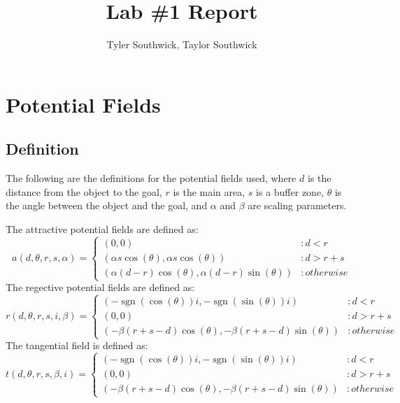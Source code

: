 \documentclass[11pt]{article}
\begin{document}
\newcommand{\sgn}{\operatorname{sgn}}

\title{Lab \#1 Report}

\author{Tyler Southwick, Taylor Southwick}

\date{}

\maketitle

\section{Potential Fields}
\subsection{Definition}
The following are the definitions for the potential fields used, where $d$ is the distance from the object to the goal, $r$ is the main area, $s$ is a buffer zone, $\theta$ is the angle between the object and the goal, and $\alpha$ and $\beta$ are scaling parameters.

The attractive potential fields are defined as:
\begin{equation}
a(d,\theta,r,s,\alpha) = \left\{
     \begin{array}{ll}
       (0,0) & : d < r\\
			(\alpha s  \cos(\theta),\alpha s \cos(\theta)) & : d > r + s \\
			(\alpha (d-r) \cos(\theta),\alpha (d-r) \sin(\theta)) & : otherwise
     \end{array}
   \right.
\end{equation}
The regective potential fields are defined as:
\begin{equation}
r(d,\theta,r,s,i,\beta) = \left\{
	\begin{array}{ll}
		(-\sgn(\cos(\theta)) i,-\sgn(\sin(\theta))i) & : d < r \\
		(0,0) & : d > r + s\\
		(-\beta (r + s - d) \cos(\theta),-\beta (r + s -d) \sin(\theta)) & : otherwise
	\end{array}
\right.
\end{equation}
The tangential field is defined as:
\begin{equation}
t(d,\theta,r,s,\beta,i) = \left\{
	\begin{array}{ll}
		(-\sgn(\cos(\theta)) i,-\sgn(\sin(\theta)) i) & : d < r \\
		(0, 0) & : d > r + s \\
		(-\beta (r + s -d) \cos(\theta), -\beta (r + s - d) \sin(\theta)) & : otherwise
		
	\end{array}
\right.
\end{equation}
\end{document}

